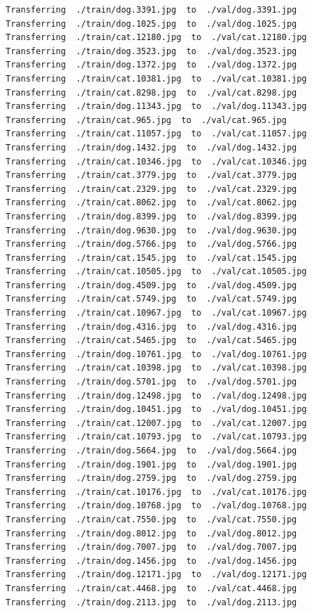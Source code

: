 \documentclass[]{book}
\theoremstyle{definition}
\theoremstyle{definition}
\theoremstyle{definition}
\theoremstyle{remark}
\begin{document}
\begin{verbatim}
Transferring  ./train/dog.3391.jpg  to  ./val/dog.3391.jpg
Transferring  ./train/dog.1025.jpg  to  ./val/dog.1025.jpg
Transferring  ./train/cat.12180.jpg  to  ./val/cat.12180.jpg
Transferring  ./train/dog.3523.jpg  to  ./val/dog.3523.jpg
Transferring  ./train/dog.1372.jpg  to  ./val/dog.1372.jpg
Transferring  ./train/cat.10381.jpg  to  ./val/cat.10381.jpg
Transferring  ./train/cat.8298.jpg  to  ./val/cat.8298.jpg
Transferring  ./train/dog.11343.jpg  to  ./val/dog.11343.jpg
Transferring  ./train/cat.965.jpg  to  ./val/cat.965.jpg
Transferring  ./train/cat.11057.jpg  to  ./val/cat.11057.jpg
Transferring  ./train/dog.1432.jpg  to  ./val/dog.1432.jpg
Transferring  ./train/cat.10346.jpg  to  ./val/cat.10346.jpg
Transferring  ./train/cat.3779.jpg  to  ./val/cat.3779.jpg
Transferring  ./train/cat.2329.jpg  to  ./val/cat.2329.jpg
Transferring  ./train/cat.8062.jpg  to  ./val/cat.8062.jpg
Transferring  ./train/dog.8399.jpg  to  ./val/dog.8399.jpg
Transferring  ./train/dog.9630.jpg  to  ./val/dog.9630.jpg
Transferring  ./train/dog.5766.jpg  to  ./val/dog.5766.jpg
Transferring  ./train/cat.1545.jpg  to  ./val/cat.1545.jpg
Transferring  ./train/cat.10505.jpg  to  ./val/cat.10505.jpg
Transferring  ./train/dog.4509.jpg  to  ./val/dog.4509.jpg
Transferring  ./train/cat.5749.jpg  to  ./val/cat.5749.jpg
Transferring  ./train/cat.10967.jpg  to  ./val/cat.10967.jpg
Transferring  ./train/dog.4316.jpg  to  ./val/dog.4316.jpg
Transferring  ./train/cat.5465.jpg  to  ./val/cat.5465.jpg
Transferring  ./train/dog.10761.jpg  to  ./val/dog.10761.jpg
Transferring  ./train/cat.10398.jpg  to  ./val/cat.10398.jpg
Transferring  ./train/dog.5701.jpg  to  ./val/dog.5701.jpg
Transferring  ./train/dog.12498.jpg  to  ./val/dog.12498.jpg
Transferring  ./train/dog.10451.jpg  to  ./val/dog.10451.jpg
Transferring  ./train/cat.12007.jpg  to  ./val/cat.12007.jpg
Transferring  ./train/cat.10793.jpg  to  ./val/cat.10793.jpg
Transferring  ./train/dog.5664.jpg  to  ./val/dog.5664.jpg
Transferring  ./train/dog.1901.jpg  to  ./val/dog.1901.jpg
Transferring  ./train/dog.2759.jpg  to  ./val/dog.2759.jpg
Transferring  ./train/cat.10176.jpg  to  ./val/cat.10176.jpg
Transferring  ./train/dog.10768.jpg  to  ./val/dog.10768.jpg
Transferring  ./train/cat.7550.jpg  to  ./val/cat.7550.jpg
Transferring  ./train/dog.8012.jpg  to  ./val/dog.8012.jpg
Transferring  ./train/dog.7007.jpg  to  ./val/dog.7007.jpg
Transferring  ./train/dog.1456.jpg  to  ./val/dog.1456.jpg
Transferring  ./train/dog.12171.jpg  to  ./val/dog.12171.jpg
Transferring  ./train/cat.4468.jpg  to  ./val/cat.4468.jpg
Transferring  ./train/dog.2113.jpg  to  ./val/dog.2113.jpg

\end{verbatim}
\end{document}
